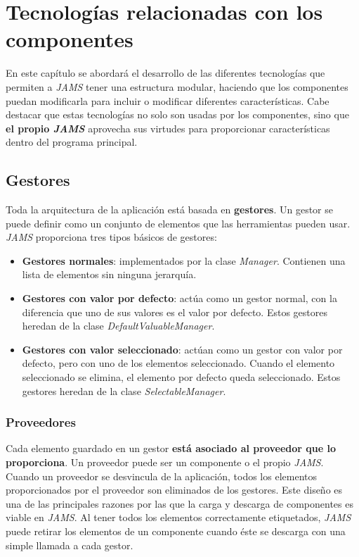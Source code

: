 \chapter{Tecnologías relacionadas con los componentes}\label{ch:tecnologias-relacionadas-con-los-componentes}

En este capítulo se abordará el desarrollo de las
diferentes tecnologías que permiten a \textit{JAMS}
tener una estructura modular, haciendo que los
componentes puedan modificarla para incluir o modificar
diferentes características.
Cabe destacar que estas tecnologías no solo son usadas
por los componentes, sino que \textbf{el propio \textit{JAMS}}
aprovecha sus virtudes para proporcionar características
dentro del programa principal.


\section{Gestores}\label{sec:gestores}

Toda la arquitectura de la aplicación está basada en \textbf{gestores}.
Un gestor se puede definir como un conjunto de elementos que las herramientas pueden usar.
\textit{JAMS} proporciona tres tipos básicos de gestores:
\begin{itemize}
    \item \textbf{Gestores normales}: implementados por la clase \textit{Manager}.
    Contienen una lista de elementos sin ninguna jerarquía.
    \item \textbf{Gestores con valor por defecto}: actúa como un gestor normal, con la
    diferencia que uno de sus valores es el valor por defecto.
    Estos gestores heredan de la clase \textit{DefaultValuableManager}.
    \item \textbf{Gestores con valor seleccionado}: actúan como un gestor con valor por defecto,
    pero con uno de los elementos seleccionado.
    Cuando el elemento seleccionado se elimina, el elemento por defecto queda seleccionado.
    Estos gestores heredan de la clase \textit{SelectableManager}.
\end{itemize}

\subsection{Proveedores}\label{subsec:proveedores}

Cada elemento guardado en un gestor \textbf{está asociado al proveedor que lo proporciona}.
Un proveedor puede ser un componente o el propio \textit{JAMS}.
Cuando un proveedor se desvincula de la aplicación, todos los elementos proporcionados
por el proveedor son eliminados de los gestores.
Este diseño es una de las principales razones por las que la carga y descarga de
componentes es viable en \textit{JAMS}.
Al tener todos los elementos  correctamente etiquetados, \textit{JAMS}
puede retirar los elementos de un componente cuando éste se
descarga con una simple llamada a cada gestor.

